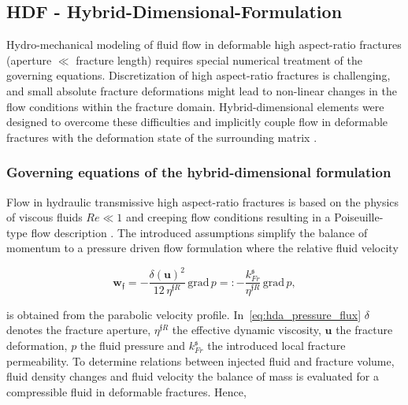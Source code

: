 \subsection{HDF - Hybrid-Dimensional-Formulation}
Hydro-mechanical modeling of fluid flow in deformable high aspect-ratio fractures (aperture $\ll$ fracture length) requires special numerical treatment of the governing equations. Discretization of high aspect-ratio fractures is challenging, and small absolute fracture deformations might lead to non-linear changes in the flow conditions within the fracture domain. Hybrid-dimensional elements were designed to overcome these difficulties and implicitly couple flow in deformable fractures with the deformation state of the surrounding matrix \cite{vinci2014, vinci2015,KIM20112094,KIM20111591,Girault2015,Girault2016,Castelletto2015,segura2004,segura2008coupledI,segura2008coupledII,vinci2014hydro,settgast2017fully,schmidt2019}.

\subsubsection*{Governing equations of the hybrid-dimensional formulation}

Flow in hydraulic transmissive high aspect-ratio fractures is based on the physics of viscous fluids $Re \ll 1$ and creeping flow conditions resulting in a Poiseuille-type flow description \cite{witherspoon1979}. The introduced assumptions simplify the balance of momentum to a pressure driven flow formulation where the relative fluid velocity

\begin{equation}
\label{eq:hda_pressure_flux}
\mathbf{w}_\mathfrak{f} = -\frac{\delta(\mathbf{u})^2}{12\,\eta^{\mathfrak{f}R}} \, \text{grad} \, p
=: -\frac{k^\mathfrak{s}_{Fr}}{\eta^{\mathfrak{f}R}} \, \text{grad} \, p,
\end{equation}

is obtained from the parabolic velocity profile. In~\eqref{eq:hda_pressure_flux} $\delta$ denotes the fracture aperture, $\eta^{\mathfrak{f}R}$ the effective dynamic viscosity, $\mathbf{u}$ the fracture deformation, $p$ the fluid pressure and $k^\mathfrak{s}_{Fr}$ the introduced local fracture permeability.
To determine relations between injected fluid and fracture volume, fluid density changes and fluid velocity the balance of mass is evaluated for a compressible fluid in deformable fractures. Hence,

